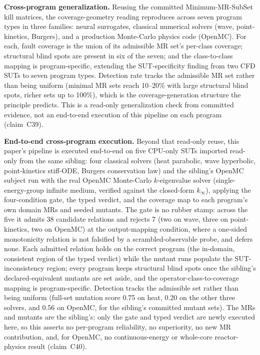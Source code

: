 \documentclass[preprint,12pt]{elsarticle}
\begin{document}
\textbf{Cross-program generalization.} Reusing the committed Minimum-MR-SubSet kill matrices, the coverage-geometry reading reproduces across seven program types in three families: neural surrogates, classical numerical solvers (wave, point-kinetics, Burgers), and a production Monte-Carlo physics code (OpenMC). For each, fault coverage is the union of its admissible MR set's per-class coverage; structural blind spots are present in six of the seven; and the class-to-class mapping is program-specific, extending the SUT-specificity finding from two CFD SUTs to seven program types. Detection rate tracks the admissible MR set rather than being uniform (minimal MR sets reach 10--20\% with large structural blind spots, richer sets up to 100\%), which is the coverage-generation structure the principle predicts. This is a read-only generalization check from committed evidence, not an end-to-end execution of this pipeline on each program (claim~C39).

\textbf{End-to-end cross-program execution.} Beyond that read-only reuse, this paper's pipeline is executed end-to-end on five CPU-only SUTs imported read-only from the same sibling: four classical solvers (heat parabolic, wave hyperbolic, point-kinetics stiff-ODE, Burgers conservation law) and the sibling's OpenMC subject run with the real OpenMC Monte-Carlo $k$-eigenvalue solver (single-energy-group infinite medium, verified against the closed-form $k_{\infty}$), applying the four-condition gate, the typed verdict, and the coverage map to each program's own domain MRs and seeded mutants. The gate is no rubber stamp: across the five it admits 38 candidate relations and rejects 7 (two on wave, three on point-kinetics, two on OpenMC) at the output-mapping condition, where a one-sided monotonicity relation is not falsified by a scrambled-observable probe, and defers none. Each admitted relation holds on the correct program (the in-domain, consistent region of the typed verdict) while the mutant runs populate the SUT-inconsistency region; every program keeps structural blind spots once the sibling's declared-equivalent mutants are set aside, and the operator-class-to-coverage mapping is program-specific. Detection tracks the admissible set rather than being uniform (full-set mutation score 0.75 on heat, 0.20 on the other three solvers, and 0.56 on OpenMC, for the sibling's committed mutant sets). The MRs and mutants are the sibling's; only the gate and typed verdict are newly executed here, so this asserts no per-program reliability, no superiority, no new MR contribution, and, for OpenMC, no continuous-energy or whole-core reactor-physics result (claim~C40).
\end{document}
